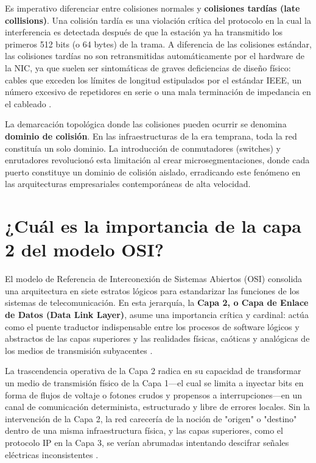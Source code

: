 \documentclass[a4paper,12pt]{article}
\begin{document}
Es imperativo diferenciar entre colisiones normales y \textbf{colisiones tardías (late collisions)}. Una colisión tardía es una violación crítica del protocolo en la cual la interferencia es detectada después de que la estación ya ha transmitido los primeros 512 bits (o 64 bytes) de la trama. A diferencia de las colisiones estándar, las colisiones tardías no son retransmitidas automáticamente por el hardware de la NIC, ya que suelen ser sintomáticas de graves deficiencias de diseño físico: cables que exceden los límites de longitud estipulados por el estándar IEEE, un número excesivo de repetidores en serie o una mala terminación de impedancia en el cableado \cite{ieee8023}.

La demarcación topológica donde las colisiones pueden ocurrir se denomina \textbf{dominio de colisión}. En las infraestructuras de la era temprana, toda la red constituía un solo dominio. La introducción de conmutadores (switches) y enrutadores revolucionó esta limitación al crear microsegmentaciones, donde cada puerto constituye un dominio de colisión aislado, erradicando este fenómeno en las arquitecturas empresariales contemporáneas de alta velocidad.

\newpage

\section{¿Cuál es la importancia de la capa 2 del modelo OSI?}

El modelo de Referencia de Interconexión de Sistemas Abiertos (OSI) consolida una arquitectura en siete estratos lógicos para estandarizar las funciones de los sistemas de telecomunicación. En esta jerarquía, la \textbf{Capa 2, o Capa de Enlace de Datos (Data Link Layer)}, asume una importancia crítica y cardinal: actúa como el puente traductor indispensable entre los procesos de software lógicos y abstractos de las capas superiores y las realidades físicas, caóticas y analógicas de los medios de transmisión subyacentes \cite{stallings2014}. 

La trascendencia operativa de la Capa 2 radica en su capacidad de transformar un medio de transmisión físico de la Capa 1—el cual se limita a inyectar bits en forma de flujos de voltaje o fotones crudos y propensos a interrupciones—en un canal de comunicación determinista, estructurado y libre de errores locales. Sin la intervención de la Capa 2, la red carecería de la noción de "origen" o "destino" dentro de una misma infraestructura física, y las capas superiores, como el protocolo IP en la Capa 3, se verían abrumadas intentando descifrar señales eléctricas inconsistentes \cite{tanenbaum2021}.
\end{document}
